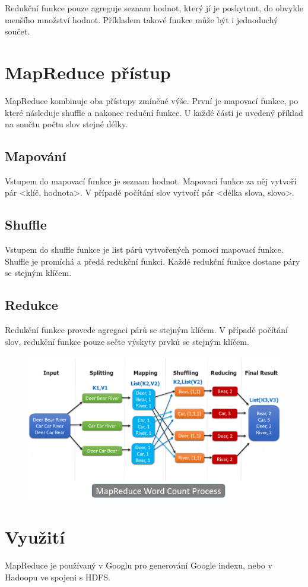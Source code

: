 \documentclass{article}
\begin{document}
Redukční funkce pouze agreguje seznam hodnot, který jí je poskytnut, do obvykle menšího množství hodnot. Příkladem takové funkce může být i jednoduchý součet.

\section*{MapReduce přístup}

MapReduce kombinuje oba přístupy zmíněné výše. První je mapovací funkce, po které následuje shuffle a nakonec reduční funkce. U každé části je uvedený příklad na součtu počtu slov stejné délky.

\subsection*{Mapování}

Vstupem do mapovací funkce je seznam hodnot. Mapovací funkce za něj vytvoří pár <klíč, hodnota>. V případě počítání slov vytvoří pár <délka slova, slovo>.

\subsection*{Shuffle}

Vstupem do shuffle funkce je list párů vytvořených pomocí mapovací funkce. Shuffle je promíchá a předá redukční funkci. Každé redukční funkce dostane páry se stejným klíčem.

\subsection*{Redukce}

Redukční funkce provede agregaci párů se stejným klíčem. V případě počítání slov, redukční funkce pouze sečte výskyty prvků se stejným klíčem.

\begin{figure}[h]
\begin{center}
\includegraphics[scale=0.4]{mapReduce.png}
\end{center}
\end{figure}


\section*{Využití}

MapReduce je používaný v Googlu pro generování Google indexu, nebo v Hadoopu ve spojeni s HDFS.
\end{document}
